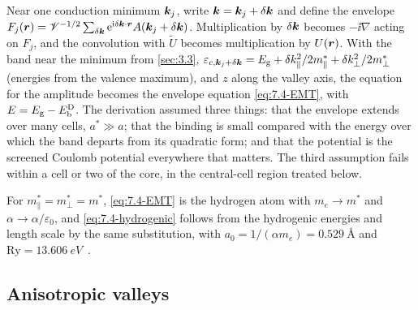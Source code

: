 Near one conduction minimum $\bm{k}_j$, write $\bm{k} = \bm{k}_j + \delta\bm{k}$ and define the envelope $F_j(\bm{r}) = \mathscr{V}^{-1/2}\sum_{\delta\bm{k}}\mathrm{e}^{\mathrm{i}\delta\bm{k}\cdot\bm{r}}A(\bm{k}_j + \delta\bm{k})$. Multiplication by $\delta\bm{k}$ becomes $-\ii\nabla$ acting on $F_j$, and the convolution with $\tilde U$ becomes multiplication by $U(\bm{r})$. With the band near the minimum from \cref{sec:3.3}, $\varepsilon_{c,\bm{k}_j+\delta\bm{k}} = E_{\mathrm{g}} + \delta k_\parallel^2/2m^*_\parallel + \delta k_\perp^2/2m^*_\perp$ (energies from the valence maximum), and $z$ along the valley axis, the equation for the amplitude becomes the envelope equation \cref{eq:7.4-EMT}, with $E = E_{\mathrm{g}} - E_{\mathrm{b}}^{\mathrm{D}}$. The derivation assumed three things: that the envelope extends over many cells, $a^* \gg a$; that the binding is small compared with the energy over which the band departs from its quadratic form; and that the potential is the screened Coulomb potential everywhere that matters. The third assumption fails within a cell or two of the core, in the central-cell region treated below.

For $m^*_\parallel = m^*_\perp = m^*$, \cref{eq:7.4-EMT} is the hydrogen atom with $m_e \to m^*$ and $\alpha \to \alpha/\varepsilon_0$, and \cref{eq:7.4-hydrogenic} follows from the hydrogenic energies and length scale by the same substitution, with $a_0 = 1/(\alpha m_e) = \SI{0.529}{\angstrom}$ and $\mathrm{Ry} = \SI{13.606}{eV}$~\cite{mohr2025codata}.

\subsection*{Anisotropic valleys}

